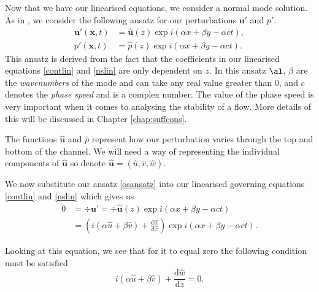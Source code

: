 Now that we have our linearised equations, we consider a normal mode solution. As in \citet{drazin2004hydrodynamic}, we consider the following ansatz for our perturbations $ \mathbf{u}' $ and $ p'$.
\begin{align}
    \mathbf{u}' ( \mathbf{x}, t) &= \hat{\mathbf{u}}(z) \exp{i(\alpha x + \beta y - \alpha c t)}, \nonumber\\
    p'(\mathbf{x}, t) &= \hat{p}(z) \exp{i(\alpha x + \beta y - \alpha c t)}.
\label{osansatz}
\end{align}
This ansatz is derived from the fact that the coefficients in our linearised equations \eqref{contlin} and \eqref{nslin} are only dependent on $ z $. In this ansatz $ \al$, $ \beta$ are the \emph{wavenumbers} of the mode and can take any real value greater than $0 $, and $ c $ denotes the \emph{phase speed} and is a complex number. The value of the phase speed is very important when it comes to analysing the stability of a flow. More details of this will be discussed in Chapter \ref{chap:suffcons}.

The functions $ \hat{\mathbf{u}}$ and $ \hat{p} $ represent how our perturbation varies through the top and bottom of the channel. We will need a way of representing the individual components of $ \hat{\mathbf{u}}$ so denote $ \hat{\mathbf{u}} = ( \hat{u}, \hat{v}, \hat{w} ) $.

We now substitute our ansatz \eqref{osansatz} into our linearised governing equations \eqref{contlin} and \eqref{nslin} which gives us
\begin{align}
    0 &= \div \mathbf{u}' = \div \hat{\mathbf{u}}(z) \exp{i(\alpha x + \beta y - \alpha c t)} \nonumber\\
    &= (i(\alpha \hat{u} + \beta \hat{v}) + \frac{\text{d}\hat{w}}{\text{d}z})\exp{i(\alpha x + \beta y - \alpha c t)}.
\end{align}

Looking at this equation, we see that for it to equal zero the following condition must be satisfied 
\begin{equation}
    i(\alpha \hat{u} + \beta \hat{v}) + \frac{\text{d}\hat{w}}{\text{d}z} = 0.
\label{os1}
\end{equation}

